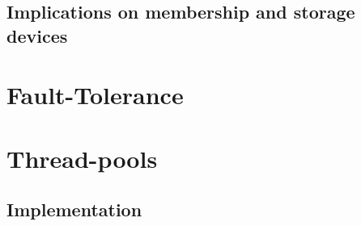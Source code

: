 \documentclass{report}
\begin{document}
			\section{Implications on membership and storage devices}
	
				\paragraph{}
				
				\paragraph{}

	\chapter{Fault-Tolerance}
	
	        \paragraph{}
	        
	        \paragraph{}

	\chapter{Thread-pools}
	
	        \paragraph{}
	        
	        \paragraph{}

			\section{Implementation}
	
				\paragraph{}
				
				\paragraph{}
\end{document}
